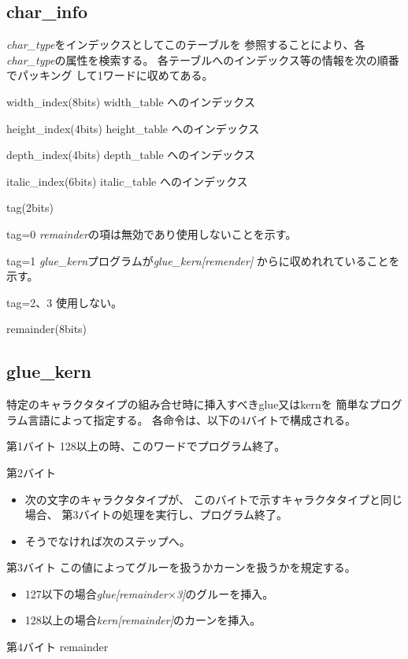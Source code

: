 ﻿\documentclass[twoside]{jarticle}
\begin{document}
\subsection{char\_info}
{\it char\_type}をインデックスとしてこのテーブルを
参照することにより、各{\it char\_type}の属性を検索する。
各テーブルへのインデックス等の情報を次の順番でパッキング
して1ワードに収めてある。
\begin{description}
\item{width\_index(8bits)} width\_table へのインデックス
\item{height\_index(4bits)} height\_table へのインデックス
\item{depth\_index(4bits)} depth\_table へのインデックス
\item{italic\_index(6bits)} italic\_table へのインデックス
\item{tag(2bits)}
	\begin{description}
	\item{tag=0} {\it remainder}の項は無効であり使用しないことを示す。
	\item{tag=1} {\it glue\_kern}プログラムが{\it glue\_kern[remender]}
		からに収めれれていることを示す。
	\item{tag=2、3} 使用しない。
	\end{description}
\item{remainder(8bits)}
\end{description}
%
\subsection{glue\_kern}
特定のキャラクタタイプの組み合せ時に挿入すべきglue又はkernを
簡単なプログラム言語によって指定する。
各命令は、以下の4バイトで構成される。
\begin{description}
\item{第1バイト} 128以上の時、このワードでプログラム終了。
\item{第2バイト}
	\begin{itemize}
	\item 次の文字のキャラクタタイプが、
		このバイトで示すキャラクタタイプと同じ場合、
		第3バイトの処理を実行し、プログラム終了。
	\item そうでなければ次のステップへ。
	\end{itemize}
\item{第3バイト}
	この値によってグルーを扱うかカーンを扱うかを規定する。
	\begin{itemize}
	\item 127以下の場合{\it glue[remainder$\times$3]}のグルーを挿入。
	\item 128以上の場合{\it kern[remainder]}のカーンを挿入。
	\end{itemize}
\item{第4バイト} remainder
\end{description}
\end{document}
